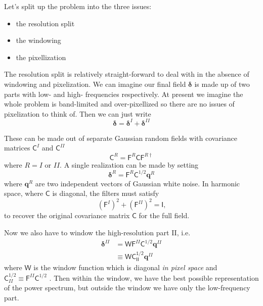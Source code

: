 \documentclass[11pt,a4paper,preprint]{aastex}
\newcommand{\bmath}[1]{\ensuremath{\bm{#1}}}
\renewcommand{\vec}[1]{\bmath{#1}}
\begin{document}
Let's split up the problem into the three issues: 

\begin{itemize}
\item the resolution split
\item the windowing
\item the pixellization
\end{itemize}

The resolution split is relatively straight-forward to deal with in
the absence of windowing and pixelization. We can imagine our final
field $\vec{\delta}$ is made up of two parts with low- and high-
frequencies respectively.  At present we imagine the whole problem is
band-limited and over-pixellized so there are no issues of
pixelization to think of. Then we can just write
\begin{equation}
\vec{\delta} = \vec{\delta}^I + \vec{\delta}^{II}
\end{equation}

These can be made out of separate Gaussian random fields with
covariance matrices $\mathsf{C}^I$ and $\mathsf{C}^{II}$
\begin{equation}
\mathsf{C}^R = \mathsf{F}^R \mathsf{C} \mathsf{F}^{R\dagger}
\end{equation}
where $R=I$ or $II$. A single realization can be made by setting
\begin{equation}
\vec{\delta}^R = \mathsf{F}^R \mathsf{C}^{1/2} \vec{q}^R
\end{equation}
where $\vec{q}^R$ are two independent vectors of Gaussian white
noise. 
 In harmonic space, where $\mathsf{C}$ is
diagonal, the filters must satisfy
\begin{equation}
(\mathsf{F}^{I})^2+ (\mathsf{F}^{II})^2 = \mathsf{I}\textrm{,}
\end{equation}
to recover the original covariance matrix $\mathsf{C}$ for the full
field. 

Now we also have to window the high-resolution part II, i.e.
\begin{align}
\vec{\delta}^{II} & = \mathsf{W} \mathsf{F}^{II} \mathsf{C}^{1/2}
\vec{q}^{II}\\
& \equiv \mathsf{WC_{II}^{1/2}} \vec{q}^{II} \label{eq:deltaII-ideal}
\end{align}
where $\mathsf{W}$ is the window function which is
diagonal {\it in pixel space} and $\mathsf{C}_{II}^{1/2} \equiv
\mathsf{F}^{II} \mathsf{C}^{1/2}$ .  Then within the window, we have the
best possible representation of the power spectrum, but outside the
window we have only the low-frequency part.
\end{document}
